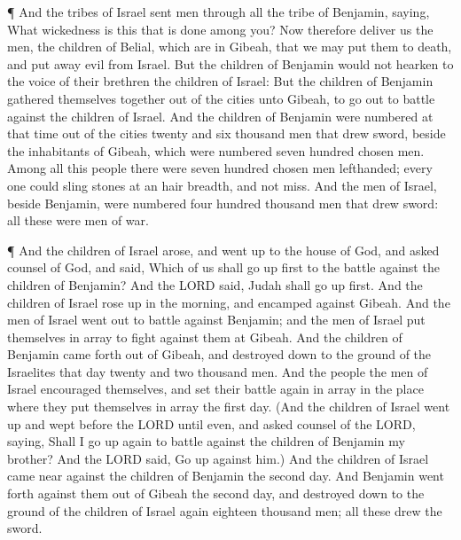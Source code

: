  ¶ And the tribes of Israel sent men through all the tribe
of Benjamin, saying, What wickedness is this that is done among you?
 Now therefore deliver us the men, the children of Belial,
which are in Gibeah, that we may put them to death, and put away evil
from Israel. But the children of Benjamin would not hearken to the voice
of their brethren the children of Israel:  But the children
of Benjamin gathered themselves together out of the cities unto Gibeah,
to go out to battle against the children of Israel.  And
the children of Benjamin were numbered at that time out of the cities
twenty and six thousand men that drew sword, beside the inhabitants of
Gibeah, which were numbered seven hundred chosen men. 
Among all this people there were seven hundred chosen men lefthanded;
every one could sling stones at an hair breadth, and not miss.
 And the men of Israel, beside Benjamin, were numbered four
hundred thousand men that drew sword: all these were men of war.

 ¶ And the children of Israel arose, and went up to the
house of God, and asked counsel of God, and said, Which of us shall go
up first to the battle against the children of Benjamin? And the LORD
said, Judah shall go up first.  And the children of Israel
rose up in the morning, and encamped against Gibeah.  And
the men of Israel went out to battle against Benjamin; and the men of
Israel put themselves in array to fight against them at Gibeah.
 And the children of Benjamin came forth out of Gibeah, and
destroyed down to the ground of the Israelites that day twenty and two
thousand men.  And the people the men of Israel encouraged
themselves, and set their battle again in array in the place where they
put themselves in array the first day.  (And the children
of Israel went up and wept before the LORD until even, and asked counsel
of the LORD, saying, Shall I go up again to battle against the children
of Benjamin my brother? And the LORD said, Go up against him.)
 And the children of Israel came near against the children
of Benjamin the second day.  And Benjamin went forth
against them out of Gibeah the second day, and destroyed down to the
ground of the children of Israel again eighteen thousand men; all these
drew the sword.

